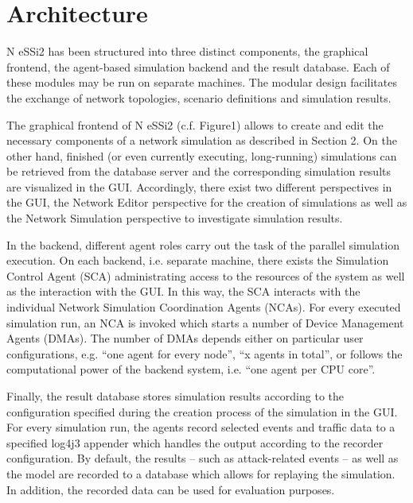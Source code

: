 \documentclass[sigconf]{aamas}
\begin{document}

\section{Architecture}

N eSSi2 has been structured into three distinct components, the graphical frontend, the agent-based simulation backend and the result database. Each of these modules may be run on separate machines. The modular design facilitates the exchange of network topologies, scenario definitions and simulation results.

The graphical frontend of N eSSi2 (c.f. Figure1) allows to create and edit the necessary components of a network simulation as described in Section 2. On the other hand, finished (or even currently executing, long-running) simulations can be retrieved from the database server and the corresponding simulation results are visualized in the GUI. Accordingly, there exist two different perspectives in the GUI, the Network Editor perspective for the creation of simulations as well as the Network Simulation perspective to investigate simulation results.

In the backend, different agent roles carry out the task of the parallel simulation execution. On each backend, i.e. separate machine, there exists the Simulation Control Agent (SCA) administrating access to the resources of the system as well as the interaction with the GUI. In this way, the SCA interacts with the individual Network Simulation Coordination Agents (NCAs). For every executed simulation run, an NCA is invoked which starts a number of Device Management Agents (DMAs). The number of DMAs depends either on particular user configurations, e.g. “one agent for every node”, “x agents in total”, or follows the computational power of the backend system, i.e. “one agent per CPU core”.

Finally, the result database stores simulation results according to the configuration specified during the creation process of the simulation in the GUI. For every simulation run, the agents record selected events and traffic data to a specified log4j3 appender which handles the output according to the recorder configuration. By default, the results – such as attack-related events – as well as the model are recorded to a database which allows for replaying the simulation. In addition, the recorded data can be used for
evaluation purposes.
\end{document}
